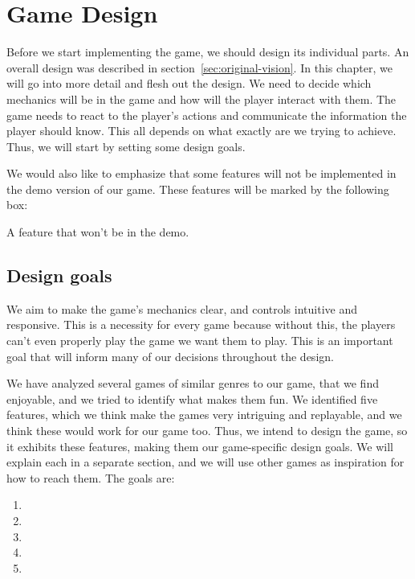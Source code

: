 \chapter{Game Design}

Before we start implementing the game, we should design its individual parts.
An overall design was described in section~\ref{sec:original-vision}.
In this chapter, we will go into more detail and flesh out the design.
We need to decide which mechanics will be in the game and how will the player interact with them.
The game needs to react to the player's actions and communicate the information the player should know.
This all depends on what exactly are we trying to achieve.
Thus, we will start by setting some design goals.

We would also like to emphasize that some features will not be implemented in the demo version of our game.
These features will be marked by the following box:
\begin{notindemo}
    A feature that won't be in the demo.
\end{notindemo}

\section{Design goals}

We aim to make the game's mechanics clear, and controls intuitive and responsive.
This is a necessity for every game because without this, the players can't even properly play the game we want them to play.
This is an important goal that will inform many of our decisions throughout the design.

We have analyzed several games of similar genres to our game, that we find enjoyable, and we tried to identify what makes them fun.
We identified five features, which we think make the games very intriguing and replayable, and we think these would work for our game too.
Thus, we intend to design the game, so it exhibits these features, making them our game-specific design goals.
We will explain each in a separate section, and we will use other games as inspiration for how to reach them.
The goals are:
\begin{enumerate}
    \item {}
    \item {}
    \item {}
    \item {}
    \item {}
\end{enumerate}

